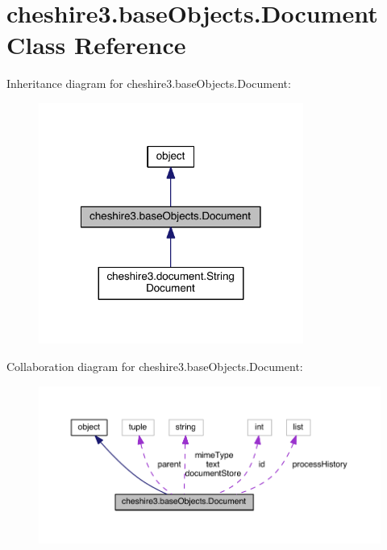 \hypertarget{classcheshire3_1_1base_objects_1_1_document}{\section{cheshire3.\-base\-Objects.\-Document Class Reference}
\label{classcheshire3_1_1base_objects_1_1_document}
}


Inheritance diagram for cheshire3.\-base\-Objects.\-Document\-:
\nopagebreak
\begin{figure}[H]
\begin{center}
\leavevmode
\includegraphics[width=246pt]{classcheshire3_1_1base_objects_1_1_document__inherit__graph}
\end{center}
\end{figure}


Collaboration diagram for cheshire3.\-base\-Objects.\-Document\-:
\nopagebreak
\begin{figure}[H]
\begin{center}
\leavevmode
\includegraphics[width=350pt]{classcheshire3_1_1base_objects_1_1_document__coll__graph}
\end{center}
\end{figure}

